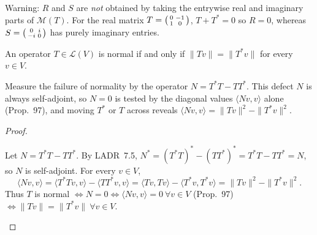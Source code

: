 \documentclass[10pt]{scrartcl}
\newcommand{\LL}{\mathcal L}\newcommand{\PP}{\mathcal P}\newcommand{\MM}{\mathcal M}
\begin{document}
Warning: $R$ and $S$ are \emph{not} obtained by taking the entrywise real and imaginary parts of $\MM(T)$. For the real matrix $T=\begin{psmallmatrix}0&-1\\1&0\end{psmallmatrix}$, $T+T^*=0$ so $R=0$, whereas $S=\begin{psmallmatrix}0&i\\-i&0\end{psmallmatrix}$ has purely imaginary entries.

\begin{theorem*}[Prop.~98 / LADR 7.20: Normality $\iff \|Tv\|=\|T^*v\|$]
  An operator $T\in\LL(V)$ is normal if and only if $\|Tv\|=\|T^*v\|$ for every $v\in V$.
\end{theorem*}
\begin{ideabox}
  Measure the failure of normality by the operator $N=T^*T-TT^*$. This defect $N$ is always self-adjoint, so $N=0$ is tested by the diagonal values $\langle Nv,v\rangle$ alone (Prop.~97), and moving $T^*$ or $T$ across reveals $\langle Nv,v\rangle = \|Tv\|^2-\|T^*v\|^2$.
\end{ideabox}
\begin{proof}
  \begin{steps}
    \ii Let $N=T^*T-TT^*$. By LADR~7.5, $N^*=(T^*T)^*-(TT^*)^* = T^*T-TT^*=N$, so $N$ is self-adjoint.
    \ii For every $v\in V$,
    \[
      \langle Nv,v\rangle = \langle T^*Tv,v\rangle - \langle TT^*v,v\rangle = \langle Tv,Tv\rangle - \langle T^*v,T^*v\rangle = \|Tv\|^2 - \|T^*v\|^2.
    \]
    \ii Thus $T$ is normal $\iff N=0 \iff \langle Nv,v\rangle=0\ \forall v\in V$ (Prop.~97) $\iff \|Tv\|=\|T^*v\|\ \forall v\in V$.
  \end{steps}
\end{proof}
\end{document}
